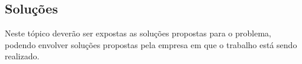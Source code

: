 


\subsection{Soluções}
    \label{subsec:solucoes}
    
    Neste tópico deverão ser expostas as soluções propostas para o problema, podendo envolver soluções propostas pela empresa em que o trabalho está sendo realizado.